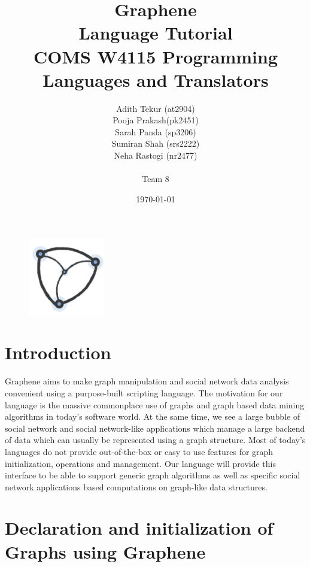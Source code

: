 \documentclass[a4paper]{article}
\title{\huge{Graphene}	\\	\LARGE{Language Tutorial} \\ \large{COMS W4115 Programming Languages and Translators}}
\author{Adith Tekur (at2904) \\ Pooja Prakash(pk2451) \\ Sarah Panda (sp3206) \\ Sumiran Shah (srs2222) \\ Neha Rastogi (nr2477) \\ \\
Team 8}
\date{\today}
\begin{document}
\begin{figure}
\centering
\includegraphics[width=0.3\textwidth]{logo.png}
\end{figure}

\newpage
\maketitle
\newpage
\tableofcontents
\maketitle
\pagebreak


\section{Introduction}

Graphene aims to make graph manipulation and social network data analysis convenient using a purpose-built scripting language. The motivation for our language is the massive commonplace use of graphs and graph based data mining algorithms in today's software world. At the same time, we see a large bubble of social network and social network-like applications which manage a large backend of data which can usually be represented using a graph structure. Most of today's languages do not provide out-of-the-box or easy to use features for graph initialization, operations and management. Our language will provide this interface to be able to support generic graph algorithms as well as specific social network applications based computations on graph-like data structures.

\section{Declaration and initialization of Graphs using Graphene}
\end{document}

